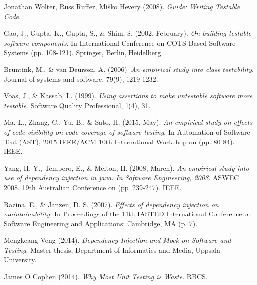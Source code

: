 \documentclass[11pt, a4paper, twocolumn]{article}
\begin{document}

\begin{thebibliography}{00}


Jonathan Wolter, Russ Ruffer, Miško Hevery (2008).
\textit{Guide: Writing Testable Code}. 

Gao, J., Gupta, K., Gupta, S., \& Shim, S. (2002, February).
\textit{On building testable software components}.
In International Conference on COTS-Based Software Systems (pp. 108-121). Springer, Berlin, Heidelberg.



Bruntink, M., \& van Deursen, A. (2006). 
\textit{An empirical study into class testability}.
Journal of systems and software, 79(9), 1219-1232.

Voas, J., \& Kassab, L. (1999).
\textit{Using assertions to make untestable software more testable}.
Software Quality Professional, 1(4), 31.

Ma, L., Zhang, C., Yu, B., \& Sato, H. (2015, May).
\textit{An empirical study on effects of code visibility on code coverage of software testing}.
In Automation of Software Test (AST), 2015 IEEE/ACM 10th International Workshop on (pp. 80-84). IEEE.



Yang, H. Y., Tempero, E., \& Melton, H. (2008, March).
\textit{An empirical study into use of dependency injection in java. In Software Engineering, 2008}.
ASWEC 2008. 19th Australian Conference on (pp. 239-247). IEEE.

Razina, E., \& Janzen, D. S. (2007). 
\textit{Effects of dependency injection on maintainability.}
In Proceedings of the 11th IASTED International Conference on Software Engineering and Applications: Cambridge, MA (p. 7).

Mengkeang Veng (2014).
\textit{Dependency Injection and Mock on Software and Testing}. 
Master thesis, Department of Informatics and Media,  Uppsala University.

James O Coplien (2014).
\textit{Why Most Unit Testing is Waste}. 
RBCS.



\end{thebibliography}
\end{document}
